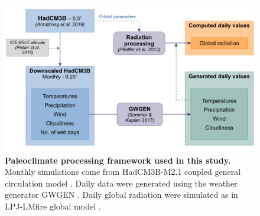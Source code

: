 \documentclass[pdflatex, sn-nature, oneside]{sn-jnl}%
\begin{document}
\begin{figure}
\hspace*{-0.7in}
\centering
\includegraphics[scale=0.85]{paleoclimate_processing.pdf}
\caption{\textbf{Paleoclimate processing framework used in this study.} Monthly simulations come from HadCM3B-M2.1 coupled general circulation model \cite{Armstrong2019}. Daily data were generated using the weather generator GWGEN \cite{Sommer2017}. Daily global radiation were simulated as in LPJ-LMfire global model \cite{Pfeiffer2013}.}
\end{figure}
\end{document}
